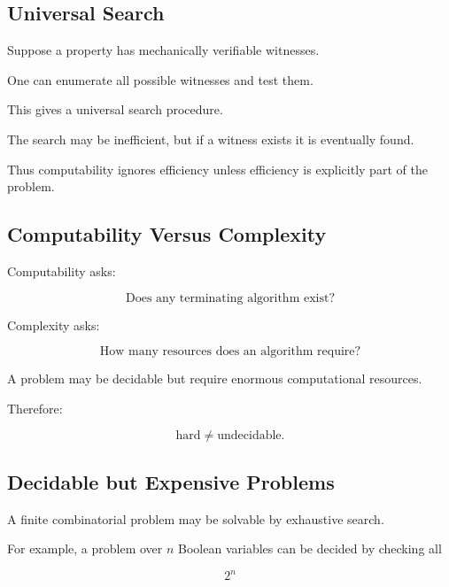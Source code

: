\subsection{Universal Search}
\label{subsec:universal-search-computability}

Suppose a property has mechanically verifiable witnesses.

One can enumerate all possible witnesses and test them.

This gives a universal search procedure.

The search may be inefficient, but if a witness exists it is eventually
found.

Thus computability ignores efficiency unless efficiency is explicitly part
of the problem.

\subsection{Computability Versus Complexity}
\label{subsec:computability-versus-complexity}

Computability asks:

\[
\boxed{
\text{Does any terminating algorithm exist?}
}
\]

Complexity asks:

\[
\boxed{
\text{How many resources does an algorithm require?}
}
\]

A problem may be decidable but require enormous computational resources.

Therefore:

\[
\boxed{
\text{hard}
\neq
\text{undecidable}.
}
\]

\subsection{Decidable but Expensive Problems}
\label{subsec:decidable-expensive-problems}

A finite combinatorial problem may be solvable by exhaustive search.

For example, a problem over \(n\) Boolean variables can be decided by
checking all

\[
\boxed{
2^n
}
\]

